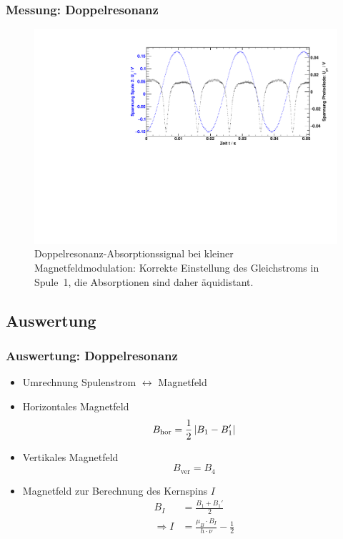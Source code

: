 \begin{frame}
\frametitle{Messung: Doppelresonanz}
\begin{figure}
\begin{center}
  \includegraphics[width=\textwidth]{../img/08.pdf}
  \caption{Doppelresonanz-Absorptionssignal bei kleiner Magnetfeldmodulation:
  Korrekte Einstellung des Gleichstroms in Spule~1,
  die Absorptionen sind daher äquidistant.}
  \label{img:rfcorrect}
\end{center}
\end{figure}
\end{frame}

\subsection{Auswertung}
\begin{frame}
\frametitle{Auswertung: Doppelresonanz}
\begin{itemize}[<+->]
    \item Umrechnung Spulenstrom $\leftrightarrow$ Magnetfeld
    \item Horizontales Magnetfeld
    \begin{equation*}
        B_\text{hor} = \frac{1}{2} \left|B_1 - B_1'\right|
    \end{equation*}
    \item Vertikales Magnetfeld
    \begin{equation*}
        B_\text{ver} = B_4
    \end{equation*}
    \item Magnetfeld zur Berechnung des Kernspins $I$
    \begin{equation*}
        \begin{split}
            B_I &= \frac{B_1 + B_1'}{2} \\
            \Rightarrow I &= \frac{\mu_B \cdot B_I}{h \cdot \nu} - \frac{1}{2}
        \end{split}
    \end{equation*}
\end{itemize}
\end{frame}

